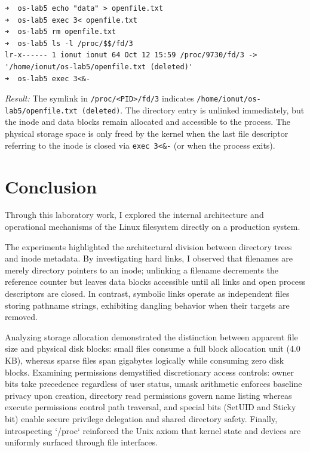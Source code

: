 \documentclass{labreport}
\begin{document}
\begin{lstlisting}[style=bash]
➜  os-lab5 echo "data" > openfile.txt
➜  os-lab5 exec 3< openfile.txt
➜  os-lab5 rm openfile.txt
➜  os-lab5 ls -l /proc/$$/fd/3
lr-x------ 1 ionut ionut 64 Oct 12 15:59 /proc/9730/fd/3 -> '/home/ionut/os-lab5/openfile.txt (deleted)'
➜  os-lab5 exec 3<&-
\end{lstlisting}
\textit{Result:} The symlink in \texttt{/proc/<PID>/fd/3} indicates \texttt{/home/ionut/os-lab5/openfile.txt (deleted)}. The directory entry is unlinked immediately, but the inode and data blocks remain allocated and accessible to the process. The physical storage space is only freed by the kernel when the last file descriptor referring to the inode is closed via \texttt{exec 3<\&-} (or when the process exits).

\section{Conclusion}

Through this laboratory work, I explored the internal architecture and operational mechanisms of the Linux filesystem directly on a production system.

The experiments highlighted the architectural division between directory trees and inode metadata. By investigating hard links, I observed that filenames are merely directory pointers to an inode; unlinking a filename decrements the reference counter but leaves data blocks accessible until all links and open process descriptors are closed. In contrast, symbolic links operate as independent files storing pathname strings, exhibiting dangling behavior when their targets are removed.

Analyzing storage allocation demonstrated the distinction between apparent file size and physical disk blocks: small files consume a full block allocation unit (4.0 KB), whereas sparse files span gigabytes logically while consuming zero disk blocks. Examining permissions demystified discretionary access controls: owner bits take precedence regardless of user status, umask arithmetic enforces baseline privacy upon creation, directory read permissions govern name listing whereas execute permissions control path traversal, and special bits (SetUID and Sticky bit) enable secure privilege delegation and shared directory safety. Finally, introspecting `/proc` reinforced the Unix axiom that kernel state and devices are uniformly surfaced through file interfaces.
\end{document}
